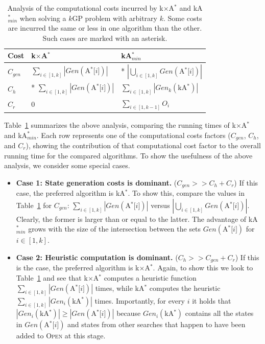 \documentclass{aicom2e}
\newcommand{\kgs}{$k$GP}
\newcommand{\kastar}{kA$^*$}
\newcommand{\kastarmin}{kA$^*_{min}$}
\newcommand{\kxastar}{k$\times$A$^*$}
\newcommand{\astari}[1]{A$^*$[$#1$]}
\newcommand{\open}{\textsc{Open}}
\begin{document}
\begin{table}
    \begin{tabular}{|l|l|l|}
        \hline
        Cost        & \kxastar{}                                    & \kastarmin \\ \hline
        $C_{gen}$   & $\sum_{i\in[1,k]} |Gen(\text{\astari{i}})|$       & * $|\bigcup_{i\in[1,k]} Gen(\text{\astari{i}})|$\\
        $C_{h}$     & * $\sum_{i\in[1,k]} |Gen(\text{\astari{i}})|$     & $\sum_{i\in[1,k]} |Gen_k(\text{\kastar{}})|$\\
        $C_r$		&	0												& $\sum_{i\in[1,k-1]} O_i$\\        
        \hline
    \end{tabular}
    \caption{Analysis of the computational costs incurred by \kxastar{} and \kastarmin{}
        when solving a \kgs{} problem with arbitrary $k$.
        Some costs are incurred the same or less in one algorithm than the other. Such cases are marked with an asterisk. }
    \label{tab:time-analysis}
\end{table}


Table~\ref{tab:time-analysis} summarizes the above analysis, comparing the
running times of \kxastar{} and \kastarmin{}. Each row represents one of the
computational costs factors ($C_{gen}$, $C_{h}$, and $C_{r}$), 
showing the contribution of that computational cost factor to the overall
running time for the compared algorithms. To show the usefulness of the above
analysis, we consider some special cases.
\begin{itemize}
    \item {\bf Case 1: State generation costs is dominant.} ($C_{gen}>>C_{h}+C_r$)
    If this case, the preferred algorithm is \kastar{}. To show this,
    compare the values in Table~\ref{tab:time-analysis} for $C_{gen}$: $\sum_{i\in[1,k]} |Gen(\text{\astari{i}})|$
    versus $|\bigcup_{i\in[1,k]} Gen(\text{\astari{i}})|$. Clearly, the former is larger than or equal to the latter.
    The advantage of \kastarmin{} grows with the size of the intersection between the sets $Gen(\text{\astari{i}})$ for $i\in[1,k]$.

    \item {\bf Case 2: Heuristic computation is dominant.} ($C_{h}>>C_{gen}+C_r$)
    If this is the case, the preferred algorithm is \kxastar{}. Again, to show this we look to Table~\ref{tab:time-analysis} and see that \kxastar{} computes a heuristic function
    $\sum_{i\in[1,k]} |Gen(\text{\astari{i}})|$ times, while
    \kastar{} computes the heuristic $\sum_{i\in[1,k]} |Gen_i(\text{\kastar})|$ times.
    Importantly, for every $i$ it holds that $|Gen_i(\text{\kastar})|\geq |Gen(\text{\astari{i}})|$
    because $Gen_i(\text{\kastar})$ contains all the states in $Gen(\text{\astari{i}})$
    and states from other searches that happen to have been added to \open{} at this stage.
\end{itemize}
\end{document}
